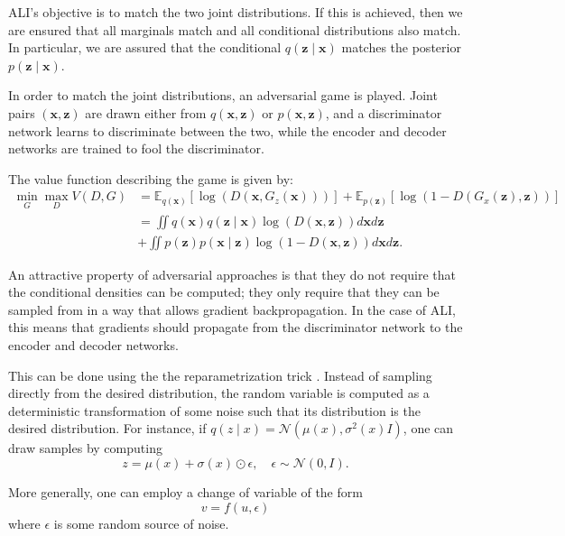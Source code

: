 \documentclass{article}
\begin{document}
ALI's objective is to match the two joint distributions. If this is achieved,
then we are ensured that all marginals match and all conditional distributions
also match. In particular, we are assured that the conditional $q(\bm{z} \mid
\bm{x})$ matches the posterior $p(\bm{z} \mid \bm{x})$.

In order to match the joint distributions, an adversarial game is played. Joint
pairs $(\bm{x}, \bm{z})$ are drawn either from $q(\bm{x}, \bm{z})$ or
$p(\bm{x}, \bm{z})$, and a discriminator network learns to discriminate between
the two, while the encoder and decoder networks are trained to fool the
discriminator.

The value function describing the game is given by:
\begin{equation}
\label{eq:value_function}
\begin{split}
    \min_G \max_D V(D, G)
	&= \mathbb{E}_{q(\bm{x})}[\log(D(\bm{x}, G_z(\bm{x})))]
	 + \mathbb{E}_{p(\bm{z})}[\log(1 - D(G_x(\bm{z}), \bm{z}))] \\
    &= \iint q(\bm{x}) q(\bm{z} \mid \bm{x})
		     \log(D(\bm{x}, \bm{z})) d\bm{x} d\bm{z} \\
    &+ \iint p(\bm{z}) p(\bm{x} \mid \bm{z})
			 \log(1 - D(\bm{x}, \bm{z})) d\bm{x} d\bm{z}.
\end{split}
\end{equation}

An attractive property of adversarial approaches is that they do not require
that the conditional densities can be computed; they only require that they can
be sampled from in a way that allows gradient backpropagation. In the case of
ALI, this means that gradients should propagate from the discriminator network
to the encoder and decoder networks.

This can be done using the the reparametrization trick
\citep{kingma2013fast,bengio2013deep,bengio2013estimating}. Instead of sampling
directly from the desired distribution, the random variable is computed as a
deterministic transformation of some noise such that its distribution is the
desired distribution. For instance, if $q(z \mid x) = \mathcal{N}(\mu(x),
\sigma^2(x)I)$, one can draw samples by computing
\begin{equation}
    z = \mu(x) + \sigma(x) \odot \epsilon, \quad
    \epsilon \sim \mathcal{N}(0, I).
\end{equation}

More generally, one can employ a change of variable of the form
\begin{equation}
    v = f(u, \epsilon)
\end{equation}
where $\epsilon$ is some random source of noise.
\end{document}
